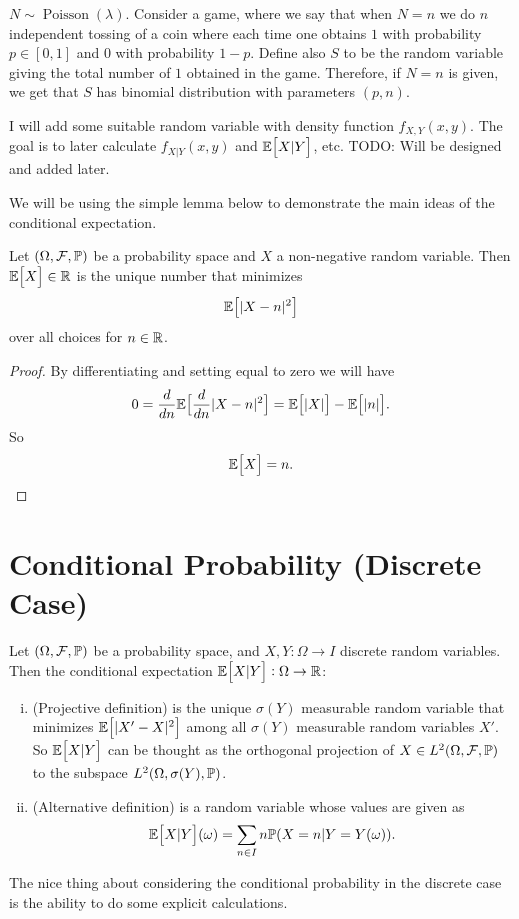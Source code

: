 \begin{example}
	\label{exp:running2}
	$ N \sim \operatorname{Poisson}(\lambda) $. Consider a game, where we say that when $ N = n $ we do $ n $ independent tossing of a coin where each time one obtains $ 1 $ with probability $ p \in[0,1] $ and $ 0 $ with probability $ 1-p $. Define also $ S $ to be the random variable giving the total number of $ 1 $ obtained in the game. Therefore, if $ N = n $ is given, we get that $ S $ has binomial distribution with parameters $ (p,n) $. 
\end{example}

\begin{example}
	I will add some suitable random variable with density function $ f_{X,Y}(x,y) $. The goal is to later calculate $ f_{X|Y}(x,y) $ and $ \mathbb{E}\big[X|Y\big] $, etc. {\color{red} \noindent TODO: Will be designed and added later.}
\end{example}


We will be using the simple lemma below to demonstrate the main ideas of the conditional expectation. 
\begin{lemma}
	\label{lem:Projection}
	Let $ (\Omega,\mathcal{F},\mathbb{P}) $ be a probability space and $ X $ a non-negative random variable. Then $ \mathbb{E}\big[X\big] \in \mathbb{R} $ is the unique number that minimizes
	\[ \mathbb{E}\big[|X-n|^2\big] \]
	over all choices for $ n\in \mathbb{R} $.
\end{lemma} 
\begin{proof}
	By differentiating and setting equal to zero we will have
	\[ 0 = \frac{d}{dn}\mathbb{E}\big[\frac{d}{dn}|X-n|^2\big] = \mathbb{E}\big[|X|\big] - \mathbb{E}\big[|n|\big]. \]
	So 
	\[ \mathbb{E}\big[X\big] = n. \]
\end{proof}


\section{Conditional Probability (Discrete Case)}
\begin{summary}
	Let $ (\Omega, \mathcal{F}, \mathbb{P}) $ be a probability space, and $ X,Y:\Omega\to I $ discrete random variables. Then the conditional expectation $ \mathbb{E}\big[X|Y\big] : \Omega \to \mathbb{R} $:
	\begin{enumerate}[(i)]
		\item (Projective definition) is the unique $ \sigma(Y) $ measurable random variable that minimizes $ \mathbb{E}\big[|X' - X|^2\big] $ among all $ \sigma(Y) $ measurable random variables $ X' $. So $ \mathbb{E}\big[X|Y\big] $ can be thought as the orthogonal projection of $ X \in L^2(\Omega, \mathcal{F},\mathbb{P}) $ to the subspace $ L^2(\Omega, \sigma(Y),\mathbb{P}) $.
		\item (Alternative definition) is a random variable whose values are given as
		\[ \mathbb{E}\big[X|Y\big](\omega) =  \sum_{n\in I} n \mathbb{P}(X=n|Y=Y(\omega)).\]
	\end{enumerate}
\end{summary}
The nice thing about considering the conditional probability in the discrete case is the ability to do some explicit calculations.


